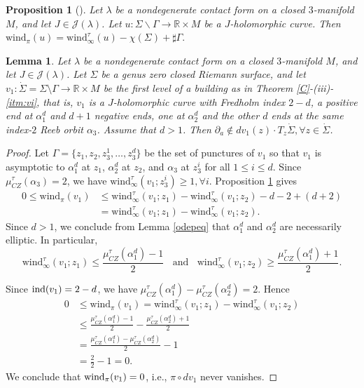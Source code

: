 \documentclass{amsart}
\newcommand{\R}{\mathbb{R}}
\newtheorem{lemma}[theorem]{Lemma}
\newtheorem{prop}[theorem]{Proposition}
\newcommand{\CZ}{\mu_{CZ}^{\tau}}
\newcommand{\wind}{\text{wind}^{\tau}}
\newcommand{\windd}{\text{wind}}
\newcommand{\ind}{\textnormal{ind}}
\begin{document}
\begin{prop}[{\cite[Proposição 5.6]{prop2}}] \label{prop5.6HWZ}
Let $\lambda$ be a nondegenerate contact form on a closed $3$-manifold $M$, and let $J \in \mathcal{J}(\lambda)$. Let $u:\Sigma \backslash \Gamma \to \R \times M$ be a $J$-holomorphic curve. Then
$\windd_{\pi}(u)=\wind_{\infty}(u)-\chi(\Sigma)+ \sharp \Gamma.$
\end{prop}

\begin{lemma} \label{partialainN}
Let $\lambda$ be a nondegenerate contact form on a closed $3$-manifold $M$, and let $J \in \mathcal{J}( \lambda)$. Let $\Sigma$ be a genus zero closed Riemann surface, and let $v_1:\dot \Sigma = \Sigma \setminus \Gamma \to \R \times M$ be the first level of a building as in Theorem \ref{C}-(iii)-\ref{itm:vi}, that is,
$v_1$ is a $J$-holomorphic curve with Fredholm index $2-d$, a positive end at $\alpha_1^d$ and $d+1$ negative ends, one at $\alpha_2^d$ and the other $d$ ends at the same index-$2$ Reeb orbit $\alpha_3$. Assume that $d>1$. Then  $\partial_a \notin dv_1(z) \cdot T_z\dot \Sigma, \forall z\in \dot \Sigma$. %
\end{lemma}
\begin{proof}
Let $\Gamma=\{z_1,z_2,z_3^1,\ldots,z_3^d\}$ be the set of punctures of $v_1$ so that 
 $v_1$ is asymptotic to $\alpha_1^d$ at $z_1$, $\alpha_2^d$ at $z_2$, and $\alpha_3$ at $z_3^i$ for all $1 \leq i \leq d$. Since $\CZ(\alpha_3)=2$, we have $\wind_{\infty}(v_1;z_3^i)\geq 1, \forall i.$   Proposition \ref{prop5.6HWZ} gives
$$
\begin{aligned}
0\leq \windd_{\pi}(v_1) &  \leq  \wind_{\infty}(v_1;z_1) - \wind_{\infty}(v_1;z_2) -d-2 +(d+2)\\
& = \wind_{\infty}(v_1;z_1) - \wind_{\infty}(v_1;z_2).
\end{aligned}
$$
Since $d>1$, we conclude from Lemma \ref{odepeq} that  $\alpha_1^d$ and $\alpha_2^d$ are necessarily elliptic. In particular,
$$\wind_{\infty}(v_1;z_1) \leq \frac{\CZ(\alpha_1^d)-1}{2} \;\; \mbox{ and } \;\; \wind_{\infty}(v_1;z_2) \geq \frac{\CZ(\alpha_1^d)+1}{2}.$$

Since $\ind(v_1)=2-d$, we have $\CZ(\alpha_1^d)-\CZ(\alpha_2^d)=2$. Hence
$$
\begin{aligned}
0 &\leq \windd_{\pi}(v_1)=\wind_{\infty}(v_1;z_1) - \wind_{\infty}(v_1;z_2)\\
&\leq  \frac{\CZ(\alpha_1^d)-1}{2} - \frac{\CZ(\alpha_2^d)+1}{2} \\
&= \frac{\CZ(\alpha_1^d)-\CZ(\alpha_2^d)}{2}-1\\
&= \frac{2}{2}-1=0.
\end{aligned}
$$
We conclude that ${\rm wind}_{\pi}(v_1)=0$, i.e., $\pi \circ dv_1$ never vanishes. %
\end{proof}
\end{document}
